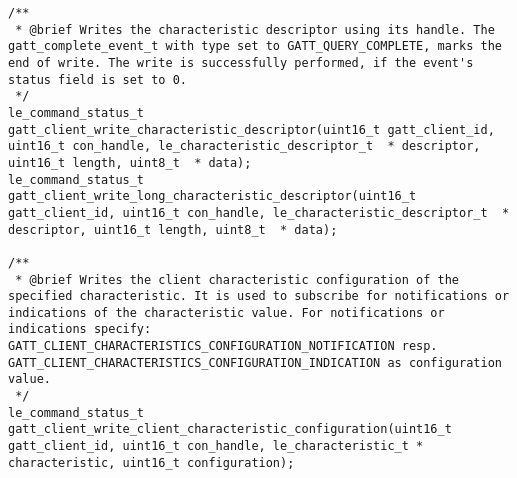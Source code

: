 \begin{lstlisting}
/** 
 * @brief Writes the characteristic descriptor using its handle. The gatt_complete_event_t with type set to GATT_QUERY_COMPLETE, marks the end of write. The write is successfully performed, if the event's status field is set to 0.
 */
le_command_status_t gatt_client_write_characteristic_descriptor(uint16_t gatt_client_id, uint16_t con_handle, le_characteristic_descriptor_t  * descriptor, uint16_t length, uint8_t  * data);
le_command_status_t gatt_client_write_long_characteristic_descriptor(uint16_t gatt_client_id, uint16_t con_handle, le_characteristic_descriptor_t  * descriptor, uint16_t length, uint8_t  * data);

/** 
 * @brief Writes the client characteristic configuration of the specified characteristic. It is used to subscribe for notifications or indications of the characteristic value. For notifications or indications specify: GATT_CLIENT_CHARACTERISTICS_CONFIGURATION_NOTIFICATION resp. GATT_CLIENT_CHARACTERISTICS_CONFIGURATION_INDICATION as configuration value.
 */
le_command_status_t gatt_client_write_client_characteristic_configuration(uint16_t gatt_client_id, uint16_t con_handle, le_characteristic_t * characteristic, uint16_t configuration);
\end{lstlisting}
\pagebreak
